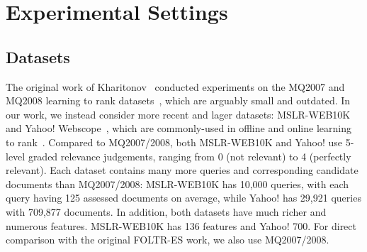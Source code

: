 \section{Experimental Settings}


\subsection{Datasets}
The original work of Kharitonov~\cite{kharitonov2019federated} conducted experiments on the MQ2007 and MQ2008 learning to rank datasets~\cite{DBLP:journals/corr/QinL13}, which are arguably small and outdated. In our work, we instead consider more recent and lager datasets: MSLR-WEB10K~\cite{DBLP:journals/corr/QinL13} and Yahoo! Webscope~\cite{DBLP:journals/jmlr/ChapelleC11}, which are commonly-used in offline and online learning to rank~\cite{zhuang2020counterfactual,DBLP:conf/wsdm/HofmannSWR13,jagerman2019model,oosterhuis2018differentiable}. Compared to MQ2007/2008, both MSLR-WEB10K and Yahoo! use 5-level graded relevance judgements, ranging from 0 (not relevant) to 4 (perfectly relevant).
Each dataset contains many more queries and corresponding candidate documents than MQ2007/2008: MSLR-WEB10K has 10,000 queries, with each query having 125 assessed documents on average, while Yahoo! has 29,921 queries with 709,877 documents. In addition, both datasets have much richer and numerous features. MSLR-WEB10K has 136 features and Yahoo! 700. For direct comparison with the original FOLTR-ES work, we also use MQ2007/2008.




